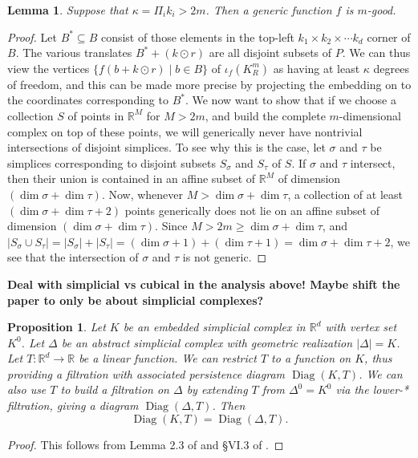\documentclass[conference]{IEEEtran}
\newtheorem{prop}[theorem]{Proposition}
\newtheorem{lemma}[theorem]{Lemma}
\theoremstyle{definition}
\numberwithin{figure}{section}
\begin{document}
\begin{lemma}
Suppose that $\kappa = \Pi_{i}k_i > 2m$. Then a generic function $f$ is $m$-good.
\end{lemma}
\begin{proof}
	Let $B^{*} \subseteq B$ consist of those elements in the top-left $k_1 \times k_2 \times \cdots k_d$ corner of $B$. The various translates $B^{*} + (k \odot r)$ are all disjoint subsets of $P$. We can thus view the vertices $\{f(b + k \odot r) \mid b \in B\}$ of $\iota_{f}(K_{R}^m)$ as having at least $\kappa$ degrees of freedom, and this can be made more precise by projecting the embedding on to the coordinates corresponding to $B^*$. We now want to show that if we choose a collection $S$ of points in $\mathbb{R}^{M}$ for $M > 2m$, and build the complete $m$-dimensional complex on top of these points, we will generically never have nontrivial intersections of disjoint simplices. To see why this is the case, let $\sigma$ and $\tau$ be simplices corresponding to disjoint subsets $S_{\sigma}$ and $S_{\tau}$ of $S$. If $\sigma$ and $\tau$ intersect, then their union is contained in an affine subset of $\mathbb{R}^M$ of dimension $(\dim \sigma + \dim \tau)$. Now, whenever $M > \dim \sigma + \dim \tau$, a collection of at least $(\dim \sigma + \dim \tau + 2)$ points generically does not lie on an affine subset of dimension $(\dim \sigma + \dim \tau)$. Since $M > 2m \geq \dim \sigma + \dim \tau$, and $|S_{\sigma} \cup S_{\tau}| = |S_{\sigma}| + |S_{\tau}| = (\dim \sigma + 1) + (\dim \tau + 1) = \dim \sigma + \dim \tau + 2$, we see that the intersection of $\sigma$ and $\tau$ is not generic.
\end{proof}

{\bf Deal with simplicial vs cubical in the analysis above! Maybe shift the paper to only be about simplicial complexes?}



\begin{prop}
	Let $K$ be an embedded simplicial complex in $\mathbb{R}^d$ with vertex set $K^{0}$. Let $\Delta$ be an abstract simplicial complex with geometric realization $|\Delta| = K$.
	Let $T: \mathbb{R}^d \to \mathbb{R}$ be a linear function. We can restrict $T$ to a function on $K$, thus providing a filtration with associated persistence diagram $\operatorname{Diag}(K,T)$. We can also use $T$ to build a filtration on $\Delta$ by extending $T$ from $\Delta^{0} = K^{0}$ via the lower-* filtration, giving a diagram $\operatorname{Diag}(\Delta,T)$. Then 
	\[\operatorname{Diag}(K,T) = \operatorname{Diag}(\Delta,T).\] 
\end{prop}
\begin{proof}
	This follows from Lemma 2.3 of \cite{bestvina1997morse} and \S VI.3 of \cite{edelsbrunner2010computational}.
\end{proof}
\end{document}
